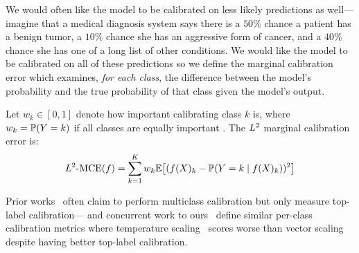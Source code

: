 

We would often like the model to be calibrated on less likely predictions as well---imagine that a medical diagnosis system says there is a $50\%$ chance a patient has a benign tumor, a $10\%$ chance she has an aggressive form of cancer, and a $40\%$ chance she has one of a long list of other conditions. We would like the model to be calibrated on all of these predictions so we define the marginal calibration error which examines, \emph{for each class}, the difference between the model's probability and the true probability of that class given the model's output.

\begin{definition}
\label{dfn:marginal-ce}
  Let $w_k \in [0, 1]$ denote how important calibrating class $k$ is, where $w_k = \mathbb{P}(Y = k)$ if all classes are equally important . The $L^2$ marginal calibration error is:
\begin{align}
L^2\textup{-MCE}(f) = \sum_{k = 1}^K w_k \mathbb{E}\big[ (f(X)_k - \mathbb{P}(Y = k \mid f(X)_k))^2 \big]
\end{align}
\end{definition}

Prior works~\cite{guo2017calibration, hendrycks2019anomaly, hendrycks2019pretraining} often claim  to perform multiclass calibration but only measure top-label calibration---\cite{nixon2019calibration} and concurrent work to ours~\cite{kull2019temperature} define similar per-class calibration metrics where temperature scaling~\cite{guo2017calibration}  scores worse than vector scaling despite having better top-label calibration.


